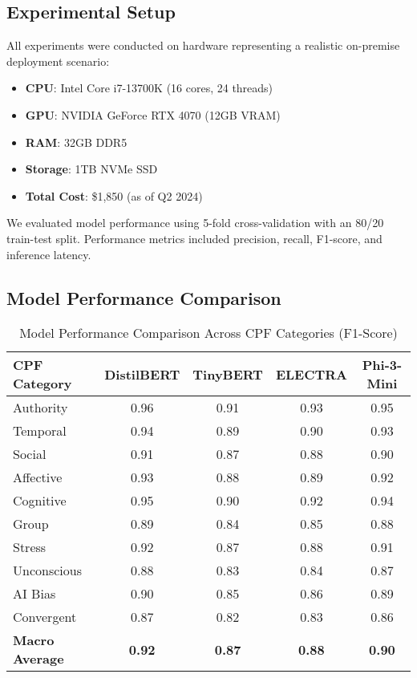 \documentclass[11pt,a4paper]{article}
\begin{document}
\subsection{Experimental Setup}
All experiments were conducted on hardware representing a realistic on-premise deployment scenario:
\begin{itemize}
    \item \textbf{CPU}: Intel Core i7-13700K (16 cores, 24 threads)
    \item \textbf{GPU}: NVIDIA GeForce RTX 4070 (12GB VRAM)
    \item \textbf{RAM}: 32GB DDR5
    \item \textbf{Storage}: 1TB NVMe SSD
    \item \textbf{Total Cost}: \$1,850 (as of Q2 2024)
\end{itemize}

We evaluated model performance using 5-fold cross-validation with an 80/20 train-test split. Performance metrics included precision, recall, F1-score, and inference latency.

\subsection{Model Performance Comparison}

\begin{table}[h!]
\centering
\caption{Model Performance Comparison Across CPF Categories (F1-Score)}
\label{tab:model-performance}
\begin{tabular}{lcccc}
\toprule
\textbf{CPF Category} & \textbf{DistilBERT} & \textbf{TinyBERT} & \textbf{ELECTRA} & \textbf{Phi-3-Mini} \\
\midrule
Authority & 0.96 & 0.91 & 0.93 & 0.95 \\
Temporal & 0.94 & 0.89 & 0.90 & 0.93 \\
Social & 0.91 & 0.87 & 0.88 & 0.90 \\
Affective & 0.93 & 0.88 & 0.89 & 0.92 \\
Cognitive & 0.95 & 0.90 & 0.92 & 0.94 \\
Group & 0.89 & 0.84 & 0.85 & 0.88 \\
Stress & 0.92 & 0.87 & 0.88 & 0.91 \\
Unconscious & 0.88 & 0.83 & 0.84 & 0.87 \\
AI Bias & 0.90 & 0.85 & 0.86 & 0.89 \\
Convergent & 0.87 & 0.82 & 0.83 & 0.86 \\
\midrule
\textbf{Macro Average} & \textbf{0.92} & \textbf{0.87} & \textbf{0.88} & \textbf{0.90} \\
\bottomrule
\end{tabular}
\end{table}
\end{document}
